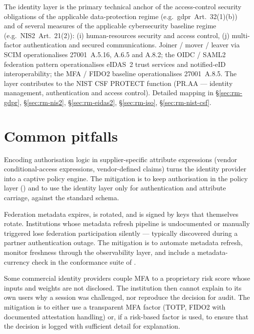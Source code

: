 \noindent The identity layer is the primary technical anchor of
the access-control security obligations of the applicable
data-protection regime (e.g.\ \gls{gdpr}~Art.~32(1)(b)) and of
several measures of the applicable cybersecurity baseline regime
(e.g.\ NIS2~Art.~21(2)): (i) human-resources security and
access control, (j) multi-factor authentication and secured
communications. Joiner / mover / leaver via SCIM operationalises
27001~A.5.16, A.6.5 and A.8.2; the OIDC / SAML2 federation pattern
operationalises eIDAS~2 trust services and notified-eID
interoperability; the MFA / FIDO2 baseline operationalises
27001~A.8.5. The layer contributes to the NIST CSF \textsf{PROTECT}
function (PR.AA --- identity management, authentication and access
control). Detailed mapping in 
\S\ref{sec:rm-gdpr}, \S\ref{sec:rm-nis2}, \S\ref{sec:rm-eidas2},
\S\ref{sec:rm-iso}, \S\ref{sec:rm-nist-csf}.

\section{Common pitfalls}
\label{sec:id-pitfalls}

\begin{pitfallbox}
\noindent Encoding authorisation logic in supplier-specific attribute
expressions (vendor conditional-access expressions, vendor-defined claims)
turns the identity provider into a captive policy engine. The
mitigation is to keep authorisation in the policy layer
() and to use the identity layer only for
authentication and attribute carriage, against the standard schema.
\end{pitfallbox}

\begin{pitfallbox}
\noindent Federation metadata expires, is rotated, and is signed by
keys that themselves rotate. Institutions whose metadata refresh
pipeline is undocumented or manually triggered lose federation
participation silently --- typically discovered during a partner
authentication outage. The mitigation is to automate metadata
refresh, monitor freshness through the observability layer, and
include a metadata-currency check in the conformance suite of
.
\end{pitfallbox}

\begin{pitfallbox}
\noindent Some commercial identity providers couple MFA to a
proprietary risk score whose inputs and weights are not disclosed.
The institution then cannot explain to its own users why a session
was challenged, nor reproduce the decision for audit. The mitigation
is to either use a transparent MFA factor (TOTP, FIDO2 with documented
attestation handling) or, if a risk-based factor is used, to ensure
that the decision is logged with sufficient detail for explanation.
\end{pitfallbox}

